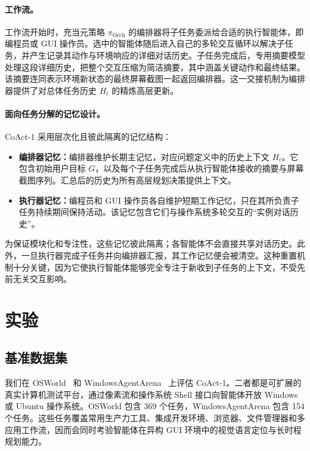 \documentclass{article} %
\newcommand{\ours}{CoAct-1\xspace}
\begin{document}
\paragraph{工作流。} 工作流开始时，充当元策略 $\pi_{\text{Orch}}$ 的编排器将子任务委派给合适的执行智能体，即编程员或 GUI 操作员。选中的智能体随后进入自己的多轮交互循环以解决子任务，并产生记录其动作与环境响应的详细对话历史。子任务完成后，专用摘要模型处理这段详细历史，把整个交互压缩为简洁摘要，其中涵盖关键动作和最终结果。该摘要连同表示环境新状态的最终屏幕截图一起返回编排器。这一交接机制为编排器提供了对总体任务历史 $H_t$ 的精炼高层更新。

\paragraph{面向任务分解的记忆设计。}
\ours 采用层次化且彼此隔离的记忆结构：
\begin{itemize}[leftmargin=0.3cm, itemindent=0cm]
    \item \textbf{编排器记忆：}编排器维护长期主记忆，对应问题定义中的历史上下文 $H_t$。它包含初始用户目标 $G$，以及每个子任务完成后从执行智能体接收的摘要与屏幕截图序列。汇总后的历史为所有高层规划决策提供上下文。
    \item \textbf{执行器记忆：}编程员和 GUI 操作员各自维护短期工作记忆，只在其所负责子任务持续期间保持活动。该记忆包含它们与操作系统多轮交互的“实例对话历史”。
\end{itemize}
为保证模块化和专注性，这些记忆彼此隔离；各智能体不会直接共享对话历史。此外，一旦执行器完成子任务并向编排器汇报，其工作记忆便会被清空。这种重置机制十分关键，因为它使执行智能体能够完全专注于新收到子任务的上下文，不受先前无关交互影响。


\section{实验}
\subsection{基准数据集}
我们在 OSWorld~\citep{xie2024osworldbenchmarkingmultimodalagents} 和 WindowsAgentArena~\citep{bonatti2024windowsagentarenaevaluating} 上评估 \ours。二者都是可扩展的真实计算机测试平台，通过像素流和操作系统 Shell 接口向智能体开放 Windows 或 Ubuntu 操作系统。OSWorld 包含 369 个任务，WindowsAgentArena 包含 154 个任务。这些任务覆盖常用生产力工具、集成开发环境、浏览器、文件管理器和多应用工作流，因而会同时考验智能体在异构 GUI 环境中的视觉语言定位与长时程规划能力。
\end{document}
